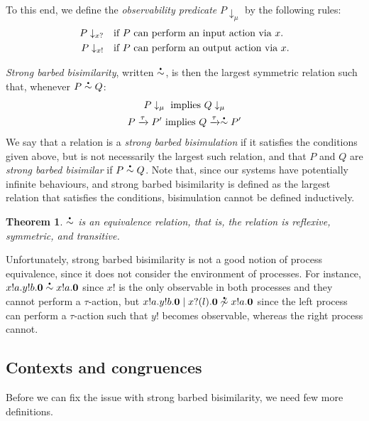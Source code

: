 \documentclass[a4paper]{article}
\newtheorem{theorem}{Theorem}
\newcommand{\Pend}{\bm{0}}
\newcommand{\Ppar}[2]{#1 \mid #2}
\newcommand{\Pout}[3]{#1 ! #2 . #3}
\newcommand{\Pin}[3]{#1 ? (#2) . #3}
\newcommand{\Atau}{\tau}
\newcommand{\transition}[3]{#1 \xrightarrow{#2} #3}
\newcommand{\observable}[2]{#1\downarrow_{#2}}
\newcommand{\obsin}[1]{#1?}
\newcommand{\obsout}[1]{#1!}
\newcommand\sbullet[1][.5]{\mathbin{\hbox{\scalebox{#1}{$\bullet$}}}}
\newcommand{\sbbisim}[2]{#1 \overset{\sbullet}{\sim} #2}
\newcommand{\nsbbisim}[2]{#1 \not\overset{\sbullet}{\sim} #2}
\begin{document}
To this end, we define the \emph{observability predicate} \( \observable{P}{\mu} \) by the following rules:
\begin{align}
  \observable{P}{\obsin{x}}  &\quad \textrm{if \( P \) can perform an input action via \( x \).} \\
  \observable{P}{\obsout{x}} &\quad \textrm{if \( P \) can perform an output action via \( x \).}
\end{align}

\emph{Strong barbed bisimilarity}, written \( \sbbisim{}{} \), is then the largest symmetric relation such that, whenever \( \sbbisim{P}{Q} \):
\begin{gather}
  \observable{P}{\mu}~\textrm{implies}~\observable{Q}{\mu} \\
  \transition{P}{\Atau}{P'}~\textrm{implies}~\transition{Q}{\Atau}{\sbbisim{}{} P'}
\end{gather}
We say that a relation is a \emph{strong barbed bisimulation} if it satisfies the conditions given above, but is not necessarily the largest such relation, and that \( P \) and \( Q \) are \emph{strong barbed bisimilar} if \( \sbbisim{P}{Q} \).
Note that, since our systems have potentially infinite behaviours, and strong barbed bisimilarity is defined as the largest relation that satisfies the conditions, bisimulation cannot be defined inductively.

\begin{theorem}
  \( \sbbisim{}{} \) is an equivalence relation, that is, the relation is reflexive, symmetric, and transitive.
\end{theorem}

Unfortunately, strong barbed bisimilarity is not a good notion of process equivalence, since it does not consider the environment of processes.
For instance, \( \sbbisim{\Pout{x}{a}{\Pout{y}{b}{\Pend}}}{\Pout{x}{a}{\Pend}} \) since \( \obsout{x} \) is the only observable in both processes and they cannot perform a \( \Atau \)-action, but \( \nsbbisim{\Ppar{\Pout{x}{a}{\Pout{y}{b}{\Pend}}}{\Pin{x}{l}{\Pend}}}{\Pout{x}{a}{\Pend}} \) since the left process can perform a \( \Atau \)-action such that \( \obsout{y} \) becomes observable, whereas the right process cannot.

\subsection{Contexts and congruences}
Before we can fix the issue with strong barbed bisimilarity, we need few more definitions.
\end{document}
